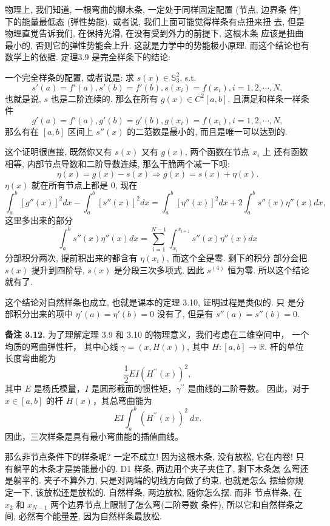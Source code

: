 \documentclass[a4paper]{ctexart}
\begin{document}
{物理上, 我们知道, 一根弯曲的柳木条, 一定处于同样固定配置 (节点, 边界条
件) 下的能量最低态 (弹性势能). 或者说, 我们上面可能觉得样条有点扭来扭
去, 但是物理直觉告诉我们, 在保持光滑, 在没有受到外力的前提下, 这根木条
应该是扭曲最小的, 否则它的弹性势能会上升. 这就是力学中的势能极小原理.
而这个结论也有数学上的依据. 定理3.9 是完全样条下的结论:

一个完全样条的配置, 或者说是: 求 $s(x) \in \mathbb{S}_3^2$, s.t. 
$$
s'(a) = f'(a), s'(b) = f'(b), s(x_i) = f(x_i), i = 1, 2, \cdots, N, 
$$
也就是说, $s$ 也是二阶连续的. 那么在所有 $g(x) \in C^2[a, b]$, 且满足和样条一样条件
$$
g'(a) = f'(a), g'(b) = g'(b), g(x_i) = f(x_i), i = 1, 2, \cdots, N, 
$$
那么有在 $[a, b]$ 区间上 $s''(x)$ 的二范数是最小的, 而且是唯一可以达到的. 

这个证明很直接, 既然你又有 $s(x)$ 又有 $g(x)$, 两个函数在节点 $x_i$ 上
还有函数相等, 内部节点导数和二阶导数连续, 那么干脆两个减一下呗:
$$
\eta(x) = g(x) - s(x) \Rightarrow g(x) = s(x) + \eta(x).
$$
$\eta(x)$ 就在所有节点上都是 $0$, 现在
$$
\int_a^b[g''(x)]^2 dx - \int_a^b[s''(x)]^2 dx
= \int_a^b[\eta''(x)]^2 dx + 2 \int_a^bs''(x)\eta''(x) dx,
$$
这里多出来的部分
$$
\int_a^bs''(x)\eta''(x) dx = \sum_{i = 1}^{N - 1} \int_{x_i}^{x_{i
    + 1}}s''(x)\eta''(x) dx
$$
分部积分两次, 提前积出来的都含有 $\eta(x_i)$, 而这个全是零. 剩下的积分
部分会把 $s(x)$ 提升到四阶导, $s(x)$ 是分段三次多项式, 因此 $s^{(4)}$
恒为零. 所以这个结论就有了.

这个结论对自然样条也成立, 也就是课本的定理 3.10, 证明过程是类似的. 只
是分部积分出来的项中 $\eta'(a) = \eta'(b) = 0$ 没有了, 但是有 $s''(a)
= s''(b) = 0$.


\noindent \textbf{备注 3.12.} 为了理解定理 3.9 和 3.10 的物理意义，我们考虑在二维空间中，
一个均质的弯曲弹性杆， 其中心线 $\gamma=(x, H(x))$, 其中 $H:[a, b]\rightarrow \mathbb{R}$. 
杆的单位长度弯曲能为
\[
\frac{1}{2} E I\left(H^{\prime\prime}(x)\right)^2,
\]
其中 $E$ 是杨氏模量，$I$ 是圆形截面的惯性矩，$\gamma^{\prime\prime}$ 是曲线的二阶导数。
因此，对于 $x\in[a, b]$ 的杆 $H(x)$，其总弯曲能为
\[
E I\int_a^b\left(H^{\prime\prime}(x)\right)^2~d x.
\]
因此，三次样条是具有最小弯曲能的插值曲线。

那么非节点条件下的样条呢? 一定不成立! 因为这根木条, 没有放松, 它在内卷!
只有躺平的木条才是势能最小的. D1 样条, 两边用个夹子夹住了, 剩下木条怎
么弯还是躺平的. 夹子不算外力, 只是对两端的切线方向做了约束, 也就是怎么
摆给你规定一下, 该放松还是放松的. 自然样条, 两边放松, 随你怎么摆. 而非
节点样条, 在 $x_2$ 和 $x_{N - 1}$ 两个边界节点上限制了怎么弯(二阶导数
条件), 所以它和自然样条之间, 必然有个能量差, 因为自然样条最放松.

}
\end{document}
